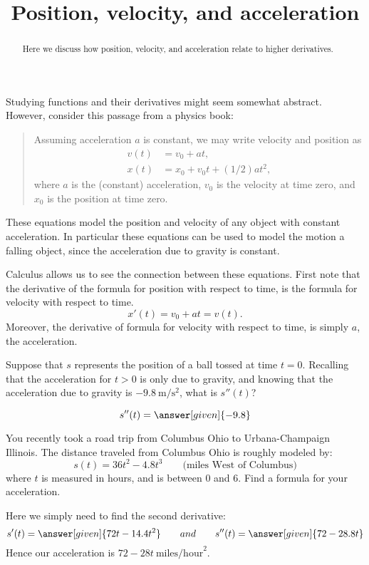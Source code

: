 \documentclass{ximera}
\title[Dig-In:]{Position, velocity, and acceleration}
\begin{document}
\begin{abstract}
  Here we discuss how position, velocity, and acceleration relate to
  higher derivatives.
\end{abstract}
\maketitle

Studying functions and their derivatives might seem somewhat
abstract. However, consider this passage from a physics book:
\begin{quote}
  Assuming acceleration $a$ is constant, we may write velocity and
  position as
  \begin{align*}
    v(t) &= v_0 + at,\\
    x(t) &= x_0 + v_0 t + (1/2) a t^2,
  \end{align*}
  where $a$ is the (constant) acceleration, $v_0$ is the velocity at
  time zero, and $x_0$ is the position at time zero.
\end{quote}
These equations model the position and velocity of any object with
constant acceleration. In particular these equations can be used to
model the motion a falling object, since the acceleration due to
gravity is constant.

Calculus allows us to see the connection between these
equations. First note that the derivative of the formula for position with respect to time, is the formula for velocity with respect to
time.
\[
x'(t) = v_0 + at = v(t).
\]
Moreover, the derivative of formula for velocity with respect to time,
is simply $a$, the acceleration.

\begin{question}
  Suppose that $s$ represents the position of a ball tossed at time
  $t=0$. Recalling that the acceleration for $t>0$ is only due to
  gravity, and knowing that the acceleration due to gravity is
  $-9.8~\mathrm{m}/\mathrm{s}^2$, what is $s''(t)$?
  \begin{prompt}
    \[
  s''(t) = \answer[given]{-9.8}
  \]
  \end{prompt}
\end{question}



\begin{example}
You recently took a road trip from Columbus Ohio to Urbana-Champaign
Illinois. The distance traveled from Columbus Ohio is roughly modeled
by:
\[
s(t) = 36t^2 -4.8t^3 \qquad\text{(miles West of Columbus)}
\]
where $t$ is measured in hours, and is between $0$ and $6$. Find a
formula for your acceleration.
  \begin{explanation}
    Here we simply need to find the second derivative:
    \[
    s'(t) = \answer[given]{72 t- 14.4 t^2} \qquad{and}\qquad s''(t) = \answer[given]{72 - 28.8t}
    \]
    Hence our acceleration is $72-28t~\text{miles/hour}^2$.
  \end{explanation}
\end{example}
\end{document}
